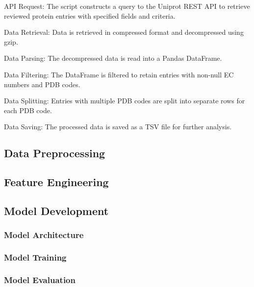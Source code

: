\begin{compactenum}
    \item API Request: The script constructs a query to the Uniprot REST API to retrieve reviewed protein entries with specified fields and criteria.
    \item Data Retrieval: Data is retrieved in compressed format and decompressed using gzip.
    \item Data Parsing: The decompressed data is read into a Pandas DataFrame.
    \item Data Filtering: The DataFrame is filtered to retain entries with non-null EC numbers and PDB codes.
    \item Data Splitting: Entries with multiple PDB codes are split into separate rows for each PDB code.
    \item Data Saving: The processed data is saved as a TSV file for further analysis.
\end{compactenum}

\subsection{Data Preprocessing}
\label{sec:Data Preprocessing}



\subsection{Feature Engineering}
\label{sec:Feature Engineering}

\subsection{Model Development}
\label{sec:Model Development}

\subsubsection{Model Architecture}
\label{sec:Model Architecture}

\subsubsection{Model Training}
\label{sec:Model Training}

\subsubsection{Model Evaluation}
\label{sec:Model Evaluation}